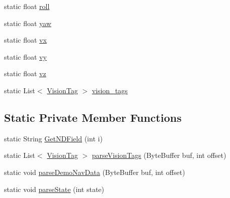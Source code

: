 \begin{DoxyCompactItemize}
\item 
static float \hyperlink{classworkspace_1_1_a_r_drone_nav_data_1_1src_1_1controller_1_1_drone_test_a51d40a655d9e34719fbdfffcd025eaa5}{roll}
\item 
static float \hyperlink{classworkspace_1_1_a_r_drone_nav_data_1_1src_1_1controller_1_1_drone_test_a3a79d04620fe8a242fa225f6174cb2d6}{yaw}
\item 
static float \hyperlink{classworkspace_1_1_a_r_drone_nav_data_1_1src_1_1controller_1_1_drone_test_aee5b32437faf364431eb128b575fb0e8}{vx}
\item 
static float \hyperlink{classworkspace_1_1_a_r_drone_nav_data_1_1src_1_1controller_1_1_drone_test_a3f83a92a77d084e233ab027708712b44}{vy}
\item 
static float \hyperlink{classworkspace_1_1_a_r_drone_nav_data_1_1src_1_1controller_1_1_drone_test_ae3be43e32715a5b7ecaf2f1ff8ae4603}{vz}
\item 
static List$<$ \hyperlink{classworkspace_1_1_a_r_drone_nav_data_1_1src_1_1controller_1_1_vision_tag}{Vision\+Tag} $>$ \hyperlink{classworkspace_1_1_a_r_drone_nav_data_1_1src_1_1controller_1_1_drone_test_af153d371e05927c3d0c1fa82667523d1}{vision\+\_\+tags}
\end{DoxyCompactItemize}
\subsection*{Static Private Member Functions}
\begin{DoxyCompactItemize}
\item 
static String \hyperlink{classworkspace_1_1_a_r_drone_nav_data_1_1src_1_1controller_1_1_drone_test_ada5828711806780c8117e59dbdd5f3db}{Get\+N\+D\+Field} (int i)
\item 
static List$<$ \hyperlink{classworkspace_1_1_a_r_drone_nav_data_1_1src_1_1controller_1_1_vision_tag}{Vision\+Tag} $>$ \hyperlink{classworkspace_1_1_a_r_drone_nav_data_1_1src_1_1controller_1_1_drone_test_a7a8567c51fce8694416352403125f692}{parse\+Vision\+Tags} (Byte\+Buffer buf, int offset)
\item 
static void \hyperlink{classworkspace_1_1_a_r_drone_nav_data_1_1src_1_1controller_1_1_drone_test_a92cb230a2831894de2a16fcd699223d1}{parse\+Demo\+Nav\+Data} (Byte\+Buffer buf, int offset)
\item 
static void \hyperlink{classworkspace_1_1_a_r_drone_nav_data_1_1src_1_1controller_1_1_drone_test_af3e38b1e3c17291303f1363d8ebb3cff}{parse\+State} (int state)
\end{DoxyCompactItemize}
